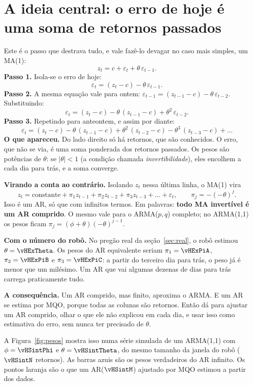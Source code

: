 \documentclass[11pt,a4paper]{article}
\begin{document}
\section{A ideia central: o erro de hoje é uma soma de retornos passados}\label{sec:ideia}

Este é o passo que destrava tudo, e vale fazê-lo devagar no caso mais simples, um MA(1):
\[
  z_t = c + \varepsilon_t + \theta\,\varepsilon_{t-1}.
\]
\textbf{Passo 1.} Isola-se o erro de hoje:
\[
  \varepsilon_t = (z_t - c) - \theta\,\varepsilon_{t-1}.
\]
\textbf{Passo 2.} A mesma equação vale para ontem: $\varepsilon_{t-1} = (z_{t-1} - c) - \theta\,\varepsilon_{t-2}$.
Substituindo:
\[
  \varepsilon_t = (z_t - c) - \theta\,(z_{t-1} - c) + \theta^2\,\varepsilon_{t-2}.
\]
\textbf{Passo 3.} Repetindo para anteontem, e assim por diante:
\[
  \varepsilon_t = (z_t - c) - \theta\,(z_{t-1} - c) + \theta^2\,(z_{t-2} - c) - \theta^3\,(z_{t-3} - c) + \dots
\]
\textbf{O que apareceu.} Do lado direito só há retornos, que são conhecidos. O erro, que não se via, é uma soma
ponderada dos retornos passados. Os pesos são potências de $\theta$: se $|\theta| < 1$ (a condição chamada
\emph{invertibilidade}), eles encolhem a cada dia para trás, e a soma converge.

\textbf{Virando a conta ao contrário.} Isolando $z_t$ nessa última linha, o MA(1) vira
\[
  z_t = \text{constante} + \pi_1 z_{t-1} + \pi_2 z_{t-2} + \pi_3 z_{t-3} + \dots + \varepsilon_t,
  \qquad \pi_j = -(-\theta)^j .
\]
Isso é um AR, só que com infinitos termos. Em palavras: \textbf{todo MA invertível é um AR comprido}. O mesmo vale para
o ARMA($p,q$) completo; no ARMA(1,1) os pesos ficam $\pi_j = (\phi + \theta)(-\theta)^{j-1}$.

\textbf{Com o número do robô.} No pregão real da seção~\ref{sec:real}, o robô estimou $\theta = \vHExTheta$. Os pesos do
AR equivalente seriam $\pi_1 = \vHExPiA$, $\pi_2 = \vHExPiB$ e $\pi_3 = \vHExPiC$: a partir do terceiro dia para trás,
o peso já é menor que um milésimo. Um AR que vai algumas dezenas de dias para trás carrega praticamente tudo.

\textbf{A consequência.} Um AR comprido, mas finito, aproxima o ARMA. E um AR se estima por MQO, porque todas as
colunas são retornos. Então dá para ajustar um AR comprido, olhar o que ele não explicou em cada dia, e usar isso
como estimativa do erro, sem nunca ter precisado de $\theta$.

A Figura~\ref{fig:pesos} mostra isso numa série simulada de um ARMA(1,1) com $\phi = \vHSintPhi$ e
$\theta = \vHSintTheta$, do mesmo tamanho da janela do robô ($\vHSintN$ retornos). As barras azuis são os pesos verdadeiros
do AR infinito. Os pontos laranja são o que um AR($\vHSintM$) ajustado por MQO estimou a partir dos dados.
\end{document}
